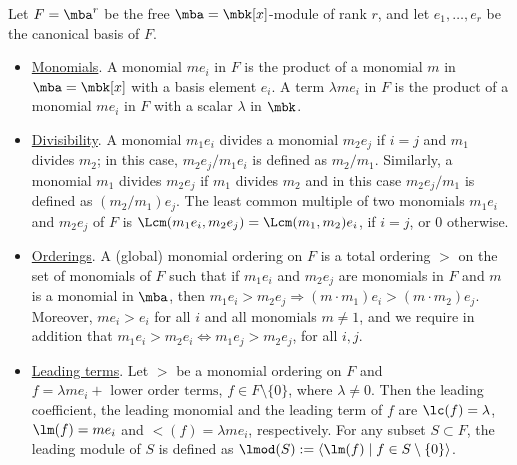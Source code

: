 \begin{definitions}\label{firstsetofdefinitions}
Let $F=\mba^r$ be the free $\mba=\mbk[x]$-module of rank $r$, and let
$e_1,\ldots ,e_r$ be the canonical basis of $F$.
\begin{itemize}
\item[$(1)$] \underline{\sc Monomials}. A monomial $me_i$ in $F$ is
  the product of a monomial $m$ in $\mba=\mbk[x]$ with a basis element
  $e_i$. A term $\lambda me_i$ in $F$ is the product of a monomial
  $me_i$ in $F$ with a scalar $\lambda$ in $\mbk$.
\item[$(2)$] \underline{\sc Divisibility}. A monomial $m_1e_i$ divides
  a monomial $m_2e_j$ if $i=j$ and $m_1$ divides $m_2$; in this case,
  $m_2e_j/m_1e_i$ is defined as $m_2/m_1$. Similarly, a monomial $m_1$
  divides $m_2e_j$ if $m_1$ divides $m_2$ and in this case
  $m_2e_j/m_1$ is defined as $(m_2/m_1)e_j$. The least common multiple
  of two monomials $m_1e_i$ and $m_2e_j$ of $F$ is
  $\Lcm(m_1e_i,m_2e_j)=\Lcm(m_1,m_2)e_i$, if $i=j$, or $0$ otherwise.
\item[$(3)$] \underline{\sc Orderings}. A (global) monomial ordering
  on $F$ is a total ordering $>$ on the set of monomials of $F$ such
  that if $m_1e_i$ and $m_2e_j$ are monomials in $F$ and $m$ is a
  monomial in $\mba$, then $m_1e_i> m_2e_j\Rightarrow (m\cdot m_1)e_i>
  (m\cdot m_2)e_j$. Moreover, $me_i>e_i$ for all $i$ and all monomials
  $m\neq 1$, and we require in addition that
  $m_1e_i>m_2e_i\Leftrightarrow m_1e_j>m_2e_j$, for all $i,j$.
\item[$(4)$] \underline{\sc Leading terms}. Let $>$ be a monomial
  ordering on $F$ and $f=\lambda me_i+\mbox{ lower order terms}$,
  $f\in F\setminus\{0\}$, where $\lambda\neq 0$. Then the leading
  coefficient, the leading monomial and the leading term of $f$ are
  $\lc(f)=\lambda$, $\lm(f)=me_i$ and $\lt(f)=\lambda me_i$,
  respectively. For any subset $S\subset F$, the leading module of $S$
  is defined as $\lmod(S):=\langle\lm(f)\mid f\in
  S\setminus\{0\}\rangle$.
\end{itemize}
\end{definitions}

